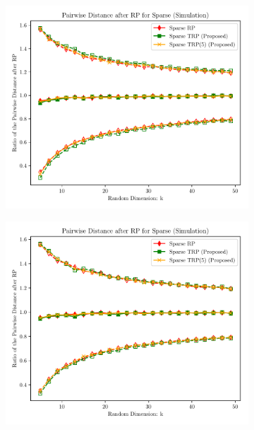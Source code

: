 \begin{figure}[ht!]
	\centering
	\begin{subfigure}{0.32\textwidth}
		\includegraphics[scale = 0.3]{figure/dist_sp0_d2500.pdf}
	\end{subfigure}
	\begin{subfigure}{0.32\textwidth}
		\includegraphics[scale = 0.3]{figure/dist_sp0_d10000.pdf}
	\end{subfigure}
	\begin{subfigure}{0.32\textwidth}

\end{subfigure}
\end{figure}
